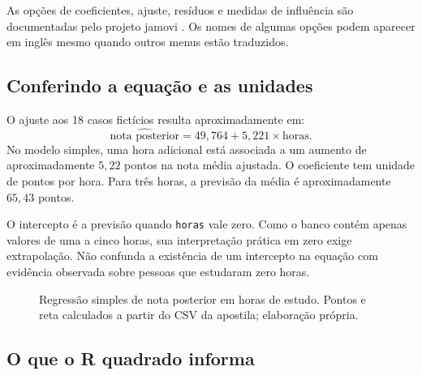 As opções de coeficientes, ajuste, resíduos e medidas de influência são documentadas pelo projeto jamovi \parencite{JamoviRegressao}. Os nomes de algumas opções podem aparecer em inglês mesmo quando outros menus estão traduzidos.

\subsection{Conferindo a equação e as unidades}

O ajuste aos 18 casos fictícios resulta aproximadamente em:
\[
\widehat{\text{nota posterior}}=49{,}764+5{,}221\times\text{horas}.
\]
No modelo simples, uma hora adicional está associada a um aumento de aproximadamente $5{,}22$ pontos na nota média ajustada. O coeficiente tem unidade de pontos por hora. Para três horas, a previsão da média é aproximadamente $65{,}43$ pontos.

O intercepto é a previsão quando \texttt{horas} vale zero. Como o banco contém apenas valores de uma a cinco horas, sua interpretação prática em zero exige extrapolação. Não confunda a existência de um intercepto na equação com evidência observada sobre pessoas que estudaram zero horas.

\begin{figure}[H]
\centering
{}
\caption{Regressão simples de nota posterior em horas de estudo. Pontos e reta calculados a partir do CSV da apostila; elaboração própria.}
\label{fig:regressao-notas}
\end{figure}

\subsection{O que o R quadrado informa}

